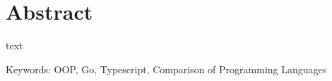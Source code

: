 \chapter*{Abstract}
\thispagestyle{empty}
text

\bigskip

\noindent
Keywords: OOP, Go, Typescript, Comparison of Programming Languages

